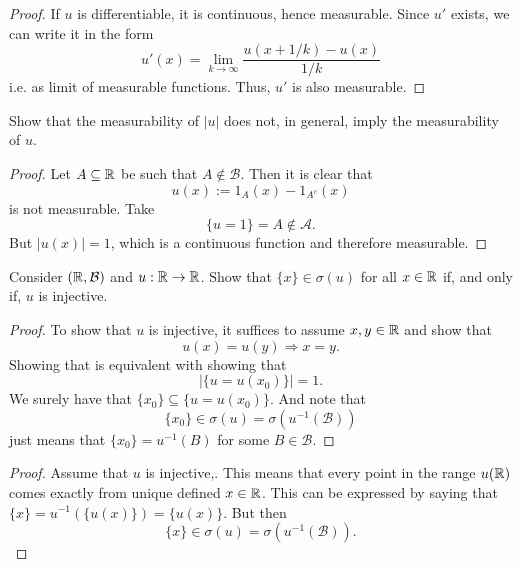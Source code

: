 \begin{proof}
If \(u\) is differentiable, it is continuous, hence measurable. Since \(u'\) exists, we can write it in the form
\[
u'(x)=\lim_{k\rightarrow \infty } \frac{u(x+1/k)-u(x)}{1/k}
\]
i.e. as limit of measurable functions. Thus, \(u'\) is also measurable.
\end{proof}

\begin{thm}[Problem 8.17]
Show that the measurability of \(|u|\) does not, in general, imply the measurability of \(u\).
\end{thm}

\begin{proof}
Let \(A\subseteq \Bbb{R}\) be such that \(A\not\in \mathcal{B}\). Then it is clear that
\[
u(x):=1_A(x)-1_{A^c}(x)
\]
is not measurable. Take
\[
\{u=1\}=A\not\in \mathcal{A}.
\]
But \(|u(x)|=1\), which is a continuous function and therefore measurable.

\end{proof}

\begin{thm}[Problem 8.14]
Consider \((\Bbb{R},\mathcal{B})\) and \(u:\Bbb{R}\rightarrow \Bbb{R}\). Show that \(\{x\}\in \sigma (u)\) for all \(x\in \Bbb{R}\) if, and only if, \(u\) is injective.
\end{thm}

\begin{proof}
To show that \(u\) is injective, it suffices to assume $x,y\in \Bbb{R}$ and show that
\[
u(x)=u(y)\Longrightarrow x=y.
\]
Showing that is equivalent with showing that
\[
|\{u=u(x_{0})\}|=1.
\]
We surely have that \(\{x_{0}\}\subseteq \{u=u(x_{0})\}\). And note that
\[
\{x_{0}\}\in \sigma (u)=\sigma (u^{-1}(\mathcal{B}))
\]
just means that \(\{x_{0}\}=u^{-1}(B)\) for some $B\in \mathcal{B}$.
\end{proof}

\begin{proof}
Assume that \(u\) is injective,. This means that every point in the range \(u(\Bbb{R})\) comes exactly from unique defined \(x\in \Bbb{R}\). This can be expressed by saying that \(\{x\}=u^{-1}(\{u(x)\})=\{u(x)\}.\) But then
\[
\{x\}\in \sigma (u)=\sigma (u^{-1}(\mathcal{B})).
\]
\end{proof}

